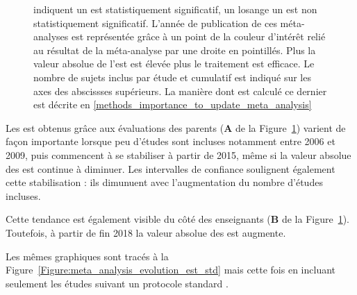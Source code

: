 \begin{figure}[h!]
{	indiquent un \gls{est} statistiquement significatif, un losange un \gls{est} non statistiquement significatif. L'année de publication de ces méta-analyses est représentée grâce à un point de la couleur 
	d'intérêt relié au résultat de la méta-analyse par une droite en pointillés.
	Plus la valeur absolue de l'\gls{est} est élevée plus le traitement est efficace.
	Le nombre de sujets inclus par étude et cumulatif est indiqué sur les axes des abscissses supérieurs. La manière dont est calculé ce dernier est 
	décrite en \ref{methods_importance_to_update_meta_analysis}}
  \label{Figure:meta_analysis_evolution_est_total}
\end{figure}

Les \gls{est} obtenus grâce aux évaluations des parents (\textbf{A} de la Figure~\ref{Figure:meta_analysis_evolution_est_total}) varient de façon 
importante lorsque peu d'études sont incluses notamment entre 2006 et 2009, puis commencent à se stabiliser à 
partir de 2015, même si la valeur absolue des \gls{est} continue à diminuer. Les intervalles de confiance soulignent également cette stabilisation : ils dimunuent 
avec l'augmentation du nombre d'études incluses. 

Cette tendance est également visible du côté des enseignants (\textbf{B} de la Figure~\ref{Figure:meta_analysis_evolution_est_total}). Toutefois, à partir 
de fin 2018 la valeur absolue des \gls{est} augmente.

Les mêmes graphiques sont tracés à la Figure~\ref{Figure:meta_analysis_evolution_est_std} mais cette fois en incluant seulement 
les études suivant un protocole standard \citep{Arns2014}.

